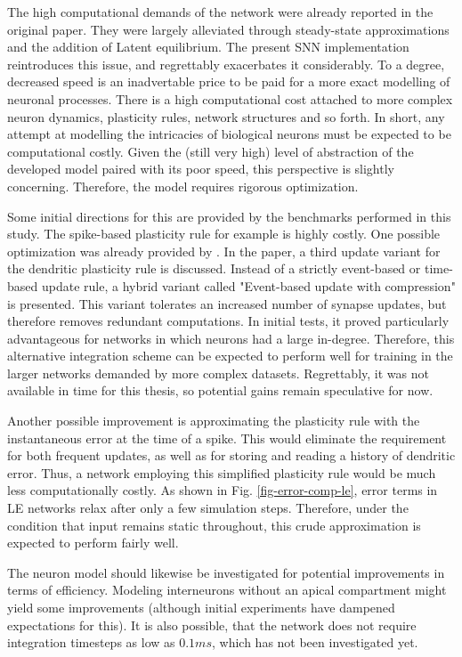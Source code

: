 The high computational demands of the network were already reported in the original paper. They were largely alleviated
through steady-state approximations and the addition of Latent equilibrium. The present SNN implementation reintroduces
this issue, and regrettably exacerbates it considerably. To a degree, decreased speed is an inadvertable price to be
paid for a more exact modelling of neuronal processes. There is a high computational cost attached to more complex
neuron dynamics, plasticity rules, network structures and so forth. In short, any attempt at modelling the intricacies
of biological neurons must be expected to be computational costly. Given the (still very high) level of abstraction of
the developed model paired with its poor speed, this perspective is slightly concerning. Therefore, the model requires
rigorous optimization.

Some initial directions for this are provided by the benchmarks performed in this study. The spike-based plasticity rule
for example is highly costly. One possible optimization was already provided by \citep{Stapmanns2021}. In the paper, a
third update variant for the dendritic plasticity rule is discussed. Instead of a strictly event-based or time-based
update rule, a hybrid variant called "Event-based update with compression" is presented. This variant tolerates an
increased number of synapse updates, but therefore removes redundant computations. In initial tests, it proved
particularly advantageous for networks in which neurons had a large in-degree. Therefore, this alternative integration
scheme can be expected to perform well for training in the larger networks demanded by more complex datasets.
Regrettably, it was not available in time for this thesis, so potential gains remain speculative for now.

Another possible improvement is approximating the plasticity rule with the instantaneous error at the time of a spike.
This would eliminate the requirement for both frequent updates, as well as for storing and reading a history of
dendritic error. Thus, a network employing this simplified plasticity rule would be much less computationally costly. As
shown in Fig. \ref{fig-error-comp-le}, error terms in LE networks relax after only a few simulation steps. Therefore,
under the condition that input remains static throughout, this crude approximation is expected to perform fairly well.

The neuron model should likewise be investigated for potential improvements in terms of efficiency. Modeling
interneurons without an apical compartment might yield some improvements (although initial experiments have dampened
expectations for this). It is also possible, that the network does not require integration timesteps as low as $0.1ms$,
which has not been investigated yet.

